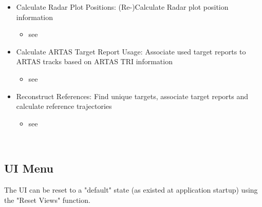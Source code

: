 \begin{itemize}
 \item Calculate Radar Plot Positions: (Re-)Calculate Radar plot position information
   \begin{itemize}
 \item see 
 \end{itemize}
 \item Calculate ARTAS Target Report Usage: Associate used target reports to ARTAS tracks based on ARTAS TRI information
   \begin{itemize}
   \item see 
   \end{itemize}
  \item Reconstruct References: Find unique targets, associate target reports and calculate reference trajectories
   \begin{itemize}
 \item see 
 \end{itemize}

\end{itemize}
\  \\

\subsection{UI Menu}
\label{sec:ui_overview_ui_menu}

The UI can be reset to a "default" state (as existed at application startup) using the "Reset Views" function.














